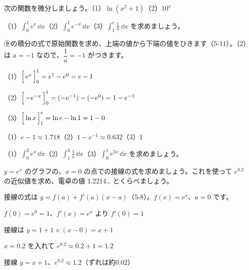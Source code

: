 \begin{jibun}
次の関数を微分しましょう。\quad（1）$\ln(x^2+1)$\quad（2）$10^x$
\end{jibun}

\begin{reidai}
（1）$\displaystyle\int_0^1e^x\,\dd x$\quad（2）$\displaystyle\int_0^1e^{-x}\,\dd x$\quad（3）$\displaystyle\int_1^e\frac{1}{x}\,\dd x$ を求めましょう。\par
\kangaekata ⑨の積分の式で原始関数を求め、上端の値から下端の値をひきます（5-11）。（2）は $a=-1$ なので、$\dfrac{1}{a}=-1$ がつきます。\par
\shiki（1）$\Bigl[\,e^x\,\Bigr]_0^1=e^1-e^0=e-1$\par
\hspace*{2.6\zw}（2）$\Bigl[\,-e^{-x}\,\Bigr]_0^1=(-e^{-1})-(-e^0)=1-e^{-1}$\par
\hspace*{2.6\zw}（3）$\Bigl[\,\ln x\,\Bigr]_1^e=\ln e-\ln1=1-0$\par
\kotae （1）$e-1\approx1.718$\quad（2）$1-e^{-1}\approx0.632$\quad（3）1
\end{reidai}

\begin{jibun}
（1）$\displaystyle\int_0^2e^{x}\,\dd x$\quad（2）$\displaystyle\int_1^3\frac{1}{x}\,\dd x$\quad（3）$\displaystyle\int_0^1e^{2x}\,\dd x$ を求めましょう。
\end{jibun}

\begin{reidai}[接線で近似する]
$y=e^x$ のグラフの、$x=0$ の点での接線の式を求めましょう。これを使って $e^{0.2}$ の近似値を求め、電卓の値 1.2214… とくらべましょう。\par
\kangaekata 接線の式は $y=f(a)+f'(a)(x-a)$（5-8）。$f(x)=e^x$、$a=0$ です。\par
\shiki $f(0)=e^0=1$、$f'(x)=e^x$ より $f'(0)=1$\par
\hspace*{2.6\zw}接線は $y=1+1\times(x-0)=x+1$\par
\hspace*{2.6\zw}$x=0.2$ を入れて $e^{0.2}\approx0.2+1=1.2$\par
\kotae 接線 $y=x+1$、$e^{0.2}\approx1.2$（ずれは約0.02）
\end{reidai}

